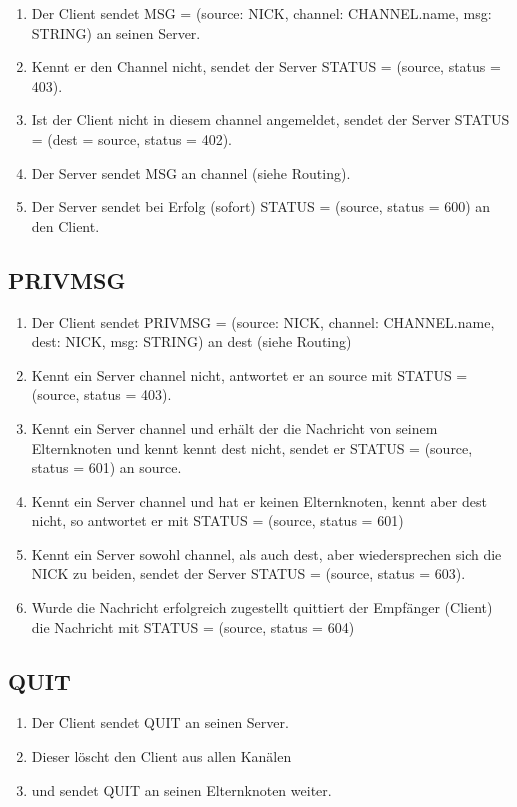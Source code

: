 \documentclass{article}
\begin{document}
\begin{enumerate}
  \item Der Client sendet MSG = (source: NICK, channel: CHANNEL.name, msg: STRING) an seinen Server.
  \item Kennt er den Channel nicht, sendet der Server STATUS = (source, status = 403).
  \item Ist der Client nicht in diesem channel angemeldet, sendet der Server STATUS = (dest = source, status = 402).
  \item Der Server sendet MSG an channel (siehe Routing).
  \item Der Server sendet bei Erfolg (sofort) STATUS = (source, status = 600) an den Client.
\end{enumerate}

\subsection{PRIVMSG}

\begin{enumerate}
  \item Der Client sendet PRIVMSG = (source: NICK, channel: CHANNEL.name, dest: NICK, msg: STRING) an dest (siehe Routing)
  \item Kennt ein Server channel nicht, antwortet er an source mit STATUS = (source, status = 403).
  \item Kennt ein Server channel und erhält der die Nachricht von seinem Elternknoten und kennt kennt dest nicht, sendet er STATUS = (source, status = 601) an source.
  \item Kennt ein Server channel und hat er keinen Elternknoten, kennt aber dest nicht, so antwortet er mit STATUS = (source, status = 601)
  \item Kennt ein Server sowohl channel, als auch dest, aber wiedersprechen sich die NICK zu beiden, sendet der Server STATUS = (source, status = 603).
  \item Wurde die Nachricht erfolgreich zugestellt quittiert der Empfänger (Client) die Nachricht mit STATUS = (source, status = 604)
\end{enumerate}

\subsection{QUIT}

\begin{enumerate}
  \item Der Client sendet QUIT an seinen Server. 
  \item Dieser löscht den Client aus allen Kanälen 
  \item und sendet QUIT an seinen Elternknoten weiter.
\end{enumerate}
\end{document}
